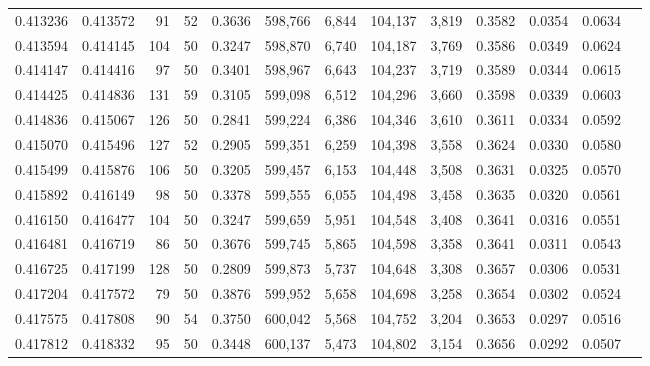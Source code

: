 \begin{tabular}{rrrrrrrrrrrrr}
0.413236 & 0.413572 &    91 &  52 &                                     0.3636 & 598,766 &   6,844 & 104,137 &   3,819 & 0.3582 & 0.0354 & 0.0634 \\
0.413594 & 0.414145 &   104 &  50 &                                     0.3247 & 598,870 &   6,740 & 104,187 &   3,769 & 0.3586 & 0.0349 & 0.0624 \\
0.414147 & 0.414416 &    97 &  50 &                                     0.3401 & 598,967 &   6,643 & 104,237 &   3,719 & 0.3589 & 0.0344 & 0.0615 \\
0.414425 & 0.414836 &   131 &  59 &                                     0.3105 & 599,098 &   6,512 & 104,296 &   3,660 & 0.3598 & 0.0339 & 0.0603 \\
0.414836 & 0.415067 &   126 &  50 &                                     0.2841 & 599,224 &   6,386 & 104,346 &   3,610 & 0.3611 & 0.0334 & 0.0592 \\
0.415070 & 0.415496 &   127 &  52 &                                     0.2905 & 599,351 &   6,259 & 104,398 &   3,558 & 0.3624 & 0.0330 & 0.0580 \\
0.415499 & 0.415876 &   106 &  50 &                                     0.3205 & 599,457 &   6,153 & 104,448 &   3,508 & 0.3631 & 0.0325 & 0.0570 \\
0.415892 & 0.416149 &    98 &  50 &                                     0.3378 & 599,555 &   6,055 & 104,498 &   3,458 & 0.3635 & 0.0320 & 0.0561 \\
0.416150 & 0.416477 &   104 &  50 &                                     0.3247 & 599,659 &   5,951 & 104,548 &   3,408 & 0.3641 & 0.0316 & 0.0551 \\
0.416481 & 0.416719 &    86 &  50 &                                     0.3676 & 599,745 &   5,865 & 104,598 &   3,358 & 0.3641 & 0.0311 & 0.0543 \\
0.416725 & 0.417199 &   128 &  50 &                                     0.2809 & 599,873 &   5,737 & 104,648 &   3,308 & 0.3657 & 0.0306 & 0.0531 \\
0.417204 & 0.417572 &    79 &  50 &                                     0.3876 & 599,952 &   5,658 & 104,698 &   3,258 & 0.3654 & 0.0302 & 0.0524 \\
0.417575 & 0.417808 &    90 &  54 &                                     0.3750 & 600,042 &   5,568 & 104,752 &   3,204 & 0.3653 & 0.0297 & 0.0516 \\
0.417812 & 0.418332 &    95 &  50 &                                     0.3448 & 600,137 &   5,473 & 104,802 &   3,154 & 0.3656 & 0.0292 & 0.0507 \\

\end{tabular}
